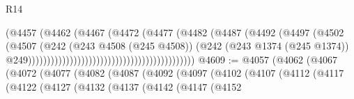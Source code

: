 \begin{lexlean}{R14}
\begin{coremodule}
{{{{{{{{{{{{{{{{{{{{{{{{{{{{{{{{{{{{{{{{{{{{{{{{{{{{{{{{{{{{{{{{{{{{{{{{{{{{{{{{{{                                                                  (@4457
                                                                    (@4462
                                                                      (@4467
                                                                        (@4472
                                                                          (@4477
                                                                            (@4482
                                                                              (@4487
                                                                                (@4492
                                                                                  (@4497
                                                                                    (@4502
                                                                                      (@4507
                                                                                        (@242
                                                                                          (@243
                                                                                            @4508
                                                                                            (@245
                                                                                              @4508))
                                                                                          (@242
                                                                                            (@243
                                                                                              @1374
                                                                                              (@245
                                                                                                @1374))
                                                                                            @249))))))))))))))))))))))))))))))))))))))))))))
@4609 := @4057
    (@4062
      (@4067
        (@4072
          (@4077
            (@4082
              (@4087
                (@4092
                  (@4097
                    (@4102
                      (@4107
                        (@4112
                          (@4117
                            (@4122
                              (@4127
                                (@4132
                                  (@4137
                                    (@4142
                                      (@4147
                                        (@4152
}}}}}}}}}}}}}}}}}}}}}}}}}}}}}}}}}}}}}}}}}}}}}}}}}}}}}}}}}}}}}}}}}}}}}}}}}}}}}}}}}}
\end{coremodule}
\end{lexlean}
